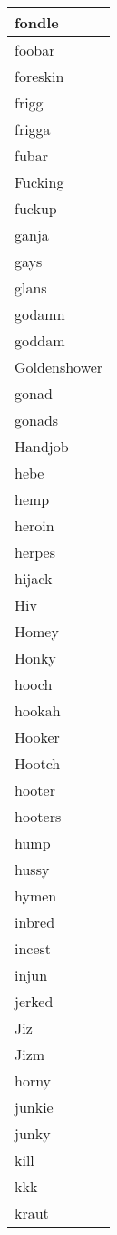 \begin{longtable}{|l|}
fondle \\ \hline 
foobar \\ \hline 
foreskin \\ \hline 
frigg \\ \hline 
frigga \\ \hline 
fubar \\ \hline 
Fucking \\ \hline 
fuckup \\ \hline 
ganja \\ \hline 
gays \\ \hline 
glans \\ \hline 
godamn \\ \hline 
goddam \\ \hline 
Goldenshower \\ \hline 
gonad \\ \hline 
gonads \\ \hline 
Handjob \\ \hline 
hebe \\ \hline 
hemp \\ \hline 
heroin \\ \hline 
herpes \\ \hline 
hijack \\ \hline 
Hiv \\ \hline 
Homey \\ \hline 
Honky \\ \hline 
hooch \\ \hline 
hookah \\ \hline 
Hooker \\ \hline 
Hootch \\ \hline 
hooter \\ \hline 
hooters \\ \hline 
hump \\ \hline 
hussy \\ \hline 
hymen \\ \hline 
inbred \\ \hline 
incest \\ \hline 
injun \\ \hline 
jerked \\ \hline 
Jiz \\ \hline 
Jizm \\ \hline 
horny \\ \hline 
junkie \\ \hline 
junky \\ \hline 
kill \\ \hline 
kkk \\ \hline 
kraut \\ \hline 

\end{longtable}
